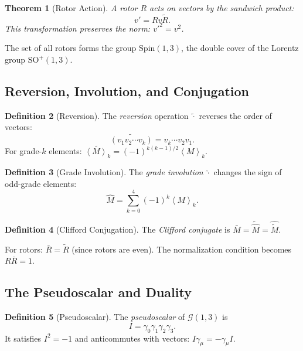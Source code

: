\documentclass[11pt,a4paper]{article}
\numberwithin{equation}{section}
\theoremstyle{plain}
\newtheorem{theorem}{Theorem}[section]
\theoremstyle{definition}
\newtheorem{definition}[theorem]{Definition}
\theoremstyle{remark}
\newcommand{\Cl}{\mathcal{G}}               %
\newcommand{\grade}[2]{\left\langle #1 \right\rangle_{#2}}
\newcommand{\rev}[1]{\widetilde{#1}}       %
\newcommand{\Spin}{\mathrm{Spin}}
\newcommand{\SO}{\mathrm{SO}}
\begin{document}
\begin{theorem}[Rotor Action]
A rotor $R$ acts on vectors by the \emph{sandwich product}:
\begin{equation}
v' = R v \rev{R}.
\label{eq:rotor-action}
\end{equation}
This transformation preserves the norm: $v'^2 = v^2$.
\end{theorem}

The set of all rotors forms the group $\Spin(1,3)$, the double cover of the Lorentz group $\SO^+(1,3)$.

\subsection{Reversion, Involution, and Conjugation}

\begin{definition}[Reversion]
The \emph{reversion} operation $\rev{\cdot}$ reverses the order of vectors:
\begin{equation}
\rev{(v_1 v_2 \cdots v_k)} = v_k \cdots v_2 v_1.
\end{equation}
For grade-$k$ elements: $\rev{\grade{M}{k}} = (-1)^{k(k-1)/2}\grade{M}{k}$.
\end{definition}

\begin{definition}[Grade Involution]
The \emph{grade involution} $\hat{\cdot}$ changes the sign of odd-grade elements:
\begin{equation}
\hat{M} = \sum_{k=0}^4 (-1)^k \grade{M}{k}.
\end{equation}
\end{definition}

\begin{definition}[Clifford Conjugation]
The \emph{Clifford conjugate} is $\bar{M} = \rev{\hat{M}} = \widehat{\rev{M}}$.
\end{definition}

For rotors: $\bar{R} = \rev{R}$ (since rotors are even). The normalization condition becomes $R \bar{R} = 1$.

\subsection{The Pseudoscalar and Duality}

\begin{definition}[Pseudoscalar]
The \emph{pseudoscalar} of $\Cl(1,3)$ is
\begin{equation}
I = \gamma_0 \gamma_1 \gamma_2 \gamma_3.
\label{eq:pseudoscalar}
\end{equation}
It satisfies $I^2 = -1$ and anticommutes with vectors: $I\gamma_\mu = -\gamma_\mu I$.
\end{definition}
\end{document}
